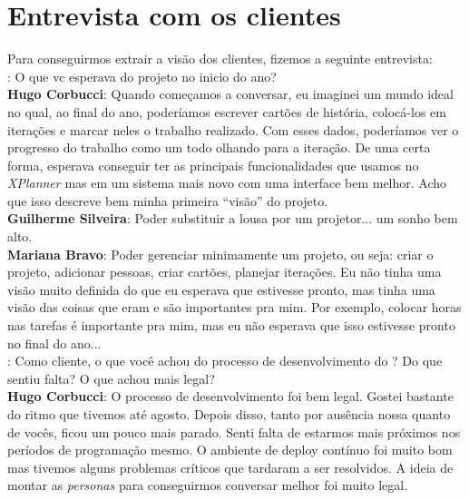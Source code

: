 \section{Entrevista com os clientes}
\label{entrevista}

Para conseguirmos extrair a visão dos clientes, fizemos a seguinte entrevista:\\

\textbf{\calopsita{}}: O que vc esperava do projeto no inicio do ano?\\

\textbf{Hugo Corbucci}: Quando começamos a conversar, eu imaginei um mundo ideal no qual, ao final do ano, poderíamos escrever cartões de história, colocá-los em iterações e marcar neles o trabalho realizado. Com esses dados, poderíamos ver o progresso do trabalho como um todo olhando para a iteração. De uma certa forma, esperava conseguir ter as principais funcionalidades que usamos no \textit{XPlanner} mas em um sistema mais novo com uma interface bem melhor. Acho que isso descreve bem minha primeira ``visão'' do projeto.\\

\textbf{Guilherme Silveira}: Poder substituir a lousa por um projetor... um sonho bem alto.\\

\textbf{Mariana Bravo}: Poder gerenciar minimamente um projeto, ou seja: criar o projeto, adicionar pessoas, criar cartões, planejar iterações.
Eu não tinha uma visão muito definida do que eu esperava que estivesse pronto, mas tinha uma visão das coisas que eram e são importantes pra mim. Por exemplo, colocar horas nas tarefas é importante pra mim, mas eu não esperava que isso estivesse pronto no final do ano...\\

\textbf{\calopsita{}}: Como cliente, o que você achou do processo de desenvolvimento do \calopsita{}? Do que sentiu falta? O que achou mais legal?\\

\textbf{Hugo Corbucci}: O processo de desenvolvimento foi bem legal. Gostei bastante do ritmo que tivemos até agosto. Depois disso, tanto por ausência nossa quanto de vocês, ficou um pouco mais parado. Senti falta de estarmos mais próximos nos períodos de programação mesmo. O ambiente de deploy contínuo foi muito bom mas tivemos alguns problemas críticos que tardaram a ser resolvidos. A ideia de montar as \textit{personas} para conseguirmos conversar melhor foi muito legal.\\

